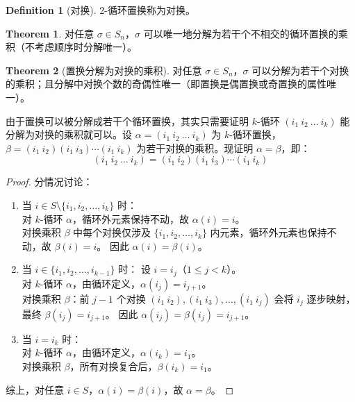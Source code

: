 \documentclass[oneside]{book}
\theoremstyle{definition}
\newtheorem{definition}{Definition}[section]
\newtheorem{theorem}{Theorem}[section]
\begin{document}
	\begin{definition}[对换]
		2-循环置换称为对换。
	\end{definition}
	
	\begin{theorem}
		对任意 \( \sigma \in S_n \)，\( \sigma \) 可以唯一地分解为若干个不相交的循环置换的乘积（不考虑顺序时分解唯一）。
	\end{theorem}
	
	\begin{theorem}[置换分解为对换的乘积]
		对任意 \( \sigma \in S_n \)，\( \sigma \) 可以分解为若干个对换的乘积；且分解中对换个数的奇偶性唯一（即置换是偶置换或奇置换的属性唯一）。
	\end{theorem}

		由于置换可以被分解成若干个循环置换，其实只需要证明 \( k \)-循环 \( (i_1\ i_2\ \dots\ i_k) \) 能分解为对换的乘积就可以。设 \( \alpha = (i_1\ i_2\ \dots\ i_k) \) 为 \( k \)-循环置换，\( \beta = (i_1\ i_2)(i_1\ i_3) \cdots (i_1\ i_k) \) 为若干对换的乘积。现证明 \( \alpha = \beta \)，即：
		\[
		(i_1\ i_2\ \dots\ i_k) = (i_1\ i_2)(i_1\ i_3) \cdots (i_1\ i_k)
		\]
		
	\begin{proof}
		
		
		分情况讨论：
		\begin{enumerate}
			\item 当 \( i \in S \setminus \{ i_1, i_2, \dots, i_k \} \) 时：\\
			对 \( k \)-循环 \( \alpha \)，循环外元素保持不动，故 \( \alpha(i) = i \)。\\
			对换乘积 \( \beta \) 中每个对换仅涉及 \( \{ i_1, i_2, \dots, i_k \} \) 内元素，循环外元素也保持不动，故 \( \beta(i) = i \)。
			因此 \( \alpha(i) = \beta(i) \)。
			\item 当 \( i \in \{ i_1, i_2, \dots, i_{k-1} \} \) 时：
			设 \( i = i_j \)（\( 1 \leq j < k \)）。\\
			对 \( k \)-循环 \( \alpha \)，由循环定义，\( \alpha(i_j) = i_{j+1} \)。\\
			对换乘积 \( \beta \)：前 \( j-1 \) 个对换 \( (i_1\ i_2), (i_1\ i_3), \dots, (i_1\ i_j) \) 会将 \( i_j \) 逐步映射，最终 \( \beta(i_j) = i_{j+1} \)。
			因此 \( \alpha(i_j) = \beta(i_j) = i_{j+1} \)。
			\item 当 \( i = i_k \) 时：\\
			对 \( k \)-循环 \( \alpha \)，由循环定义，\( \alpha(i_k) = i_1 \)。\\
			对换乘积 \( \beta \)，所有对换复合后，\( \beta(i_k) = i_1 \)。
		\end{enumerate}
		综上，对任意 \( i \in S \)，\( \alpha(i) = \beta(i) \)，故 \( \alpha = \beta \)。
	\end{proof}
	
\end{document}
